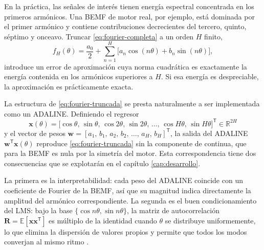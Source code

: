 \documentclass[../../../Tesis_JALS_Maestria.tex]{subfiles}
\begin{document}
En la práctica, las señales de interés tienen energía espectral concentrada en los primeros armónicos. Una BEMF de motor real, por ejemplo, está dominada por el primer armónico y contiene contribuciones decrecientes del tercero, quinto, séptimo y onceavo. Truncar \eqref{eq:fourier-completa} a un orden $H$ finito,
\begin{equation}
    f_H(\theta) = \frac{a_0}{2} + \sum_{n=1}^{H}\bigl[a_n \cos(n\theta) + b_n \sin(n\theta)\bigr],
    \label{eq:fourier-truncada}
\end{equation}
introduce un error de aproximación cuya norma cuadrática es exactamente la energía contenida en los armónicos superiores a $H$. Si esa energía es despreciable, la aproximación es prácticamente exacta.

La estructura de \eqref{eq:fourier-truncada} se presta naturalmente a ser implementada como un ADALINE. Definiendo el regresor
\begin{equation}
    \mathbf{x}(\theta) = \bigl[\cos\theta,\,\sin\theta,\,\cos 2\theta,\,\sin 2\theta,\,\ldots,\,\cos H\theta,\,\sin H\theta\bigr]^{\mathsf T} \in \mathbb{R}^{2H}
    \label{eq:regresor-fourier}
\end{equation}
y el vector de pesos $\mathbf{w} = [a_1,\,b_1,\,a_2,\,b_2,\,\ldots,\,a_H,\,b_H]^{\mathsf T}$, la salida del ADALINE $\mathbf{w}^{\mathsf T}\mathbf{x}(\theta)$ reproduce \eqref{eq:fourier-truncada} sin la componente de continua, que para la BEMF es nula por la simetría del motor. Esta correspondencia tiene dos consecuencias que se explotarán en el capítulo \ref{cap:desarrollo}.

La primera es la interpretabilidad: cada peso del ADALINE coincide con un coeficiente de Fourier de la BEMF, así que su magnitud indica directamente la amplitud del armónico correspondiente. La segunda es el buen condicionamiento del LMS: bajo la base $\{\cos n\theta, \sin n\theta\}$, la matriz de autocorrelación $\mathbf{R} = \mathbb{E}[\mathbf{x}\mathbf{x}^{\mathsf T}]$ es múltiplo de la identidad cuando $\theta$ se distribuye uniformemente, lo que elimina la dispersión de valores propios y permite que todos los modos converjan al mismo ritmo \citep{haykin2014adaptive}.
\end{document}

